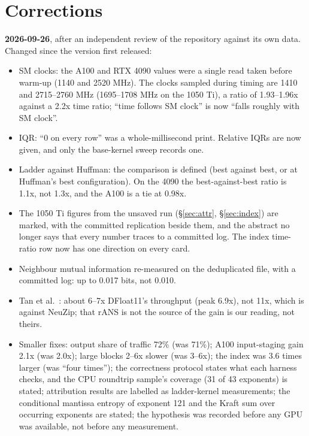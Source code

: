 \documentclass[11pt,a4paper]{article}
\newcommand{\B}[1]{\textbf{#1}}
\begin{document}
\section*{Corrections}

\B{2026-09-26}, after an independent review of the repository against its own data. Changed since the version first released:
\begin{itemize}
\item SM clocks: the A100 and RTX 4090 values were a single read taken before warm-up (1140 and 2520 MHz). The clocks sampled during timing are 1410 and 2715--2760 MHz (1695--1708 MHz on the 1050 Ti), a ratio of 1.93--1.96x against a 2.2x time ratio; ``time follows SM clock'' is now ``falls roughly with SM clock''.
\item IQR: ``0 on every row'' was a whole-millisecond print. Relative IQRs are now given, and only the base-kernel sweep records one.
\item Ladder against Huffman: the comparison is defined (best against best, or at Huffman's best configuration). On the 4090 the best-against-best ratio is 1.1x, not 1.3x, and the A100 is a tie at 0.98x.
\item The 1050 Ti figures from the unsaved run (\S\ref{sec:attr}, \S\ref{sec:index}) are marked, with the committed replication beside them, and the abstract no longer says that every number traces to a committed log. The index time-ratio row now has one direction on every card.
\item Neighbour mutual information re-measured on the deduplicated file, with a committed log: up to 0.017 bits, not 0.010.
\item Tan et al.\ \cite{shannon}: about 6--7x DFloat11's throughput (peak 6.9x), not 11x, which is against NeuZip; that rANS is not the source of the gain is our reading, not theirs.
\item Smaller fixes: output share of traffic 72\% (was 71\%); A100 input-staging gain 2.1x (was 2.0x); large blocks 2--6x slower (was 3--6x); the index was 3.6 times larger (was ``four times''); the correctness protocol states what each harness checks, and the CPU roundtrip sample's coverage (31 of 43 exponents) is stated; attribution results are labelled as ladder-kernel measurements; the conditional mantissa entropy of exponent 121 and the Kraft sum over occurring exponents are stated; the hypothesis was recorded before any GPU was available, not before any measurement.
\end{itemize}
\end{document}
